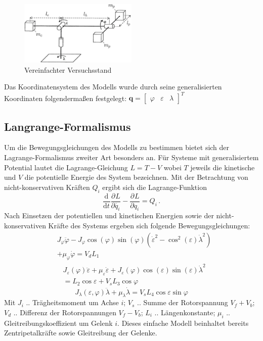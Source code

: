 \documentclass[times, 9pt,twocolumn]{article}
\newcommand{\partiell}[3][]{\frac{\partial^{#1}#2}{\partial{#3}^{#1}}}
\newcommand{\diff}[3][]{\frac{\mathrm{d}^{#1}#2}{\mathrm{d}{#3}^{#1}}}
\begin{document}
	\begin{figure}[ht]
		\centering
		\includegraphics[width=0.5\textwidth]{images/setup}
		\caption{Vereinfachter Versuchsstand}
		\label{setup}
	\end{figure}
	Das Koordinatensystem des Modells wurde durch seine generalisierten Koordinaten folgendermaßen festgelegt: $\bm q = \begin{bmatrix}
	\varphi & \varepsilon & \lambda
	\end{bmatrix}^T $

	\subsection{Langrange-Formalismus}

	Um die Bewegungsgleichungen des Modells zu bestimmen bietet sich der Lagrange-Formalismus zweiter Art besonders an. Für Systeme mit generalisiertem Potential lautet die Lagrange-Gleichung $L = T -V$ wobei $T$ jeweils die kinetische und $V$ die potentielle Energie des System bezeichnen.
	Mit der Betrachtung von nicht-konservativen Kräften $Q_i$ ergibt sich die Lagrange-Funktion
	\begin{equation}\label{eq:lagrange}
	\diff{}{t} \partiell{L}{\dot{q_i}} - \partiell{L}{q_i}=Q_i\, .
	\end{equation}
	Nach Einsetzen der potentiellen und kinetischen Energien sowie der nicht-konservativen Kräfte des Systems ergeben sich folgende Bewegungsgleichungen:
	\begin{equation}
	\begin{split}
	&J_\varphi \ddot{\varphi} - J_\varphi \cos (\varphi) \sin (\varphi) (\dot{\varepsilon}^2- \cos^2 (\varepsilon) \dot{\lambda}^2)\\  &+ \mu_\varphi \dot{\varphi} = V_d L_1
	\end{split}
	\end{equation}
	\begin{equation}
	\begin{split}
	&J_\varepsilon(\varphi)\ddot{\varepsilon} + \mu_\varepsilon \dot{\varepsilon} + J_\varepsilon(\varphi) \cos (\varepsilon) \sin (\varepsilon) \dot{\lambda}^2\\
	&= L_2 \cos \varepsilon + V_s L_3 \cos \varphi
	\end{split}
	\end{equation}
	\begin{equation}
	J_\lambda(\varepsilon,\varphi) \ddot{\lambda} + \mu_\lambda \dot{\lambda} = V_s L_4 \cos \varepsilon \sin \varphi
	\end{equation}
	Mit $J_i$ .. Trägheitsmoment um Achse $i$; $V_s$ .. Summe der Rotorspannung $V_f + V_b$; $V_d$ .. Differenz der Rotorspannungen $V_f - V_b$; $L_i$ .. Längenkonstante; $\mu_i$ .. Gleitreibungskoeffizient um Gelenk $i$. Dieses einfache Modell beinhaltet bereits Zentripetalkräfte sowie Gleitreibung der Gelenke.
\end{document}

